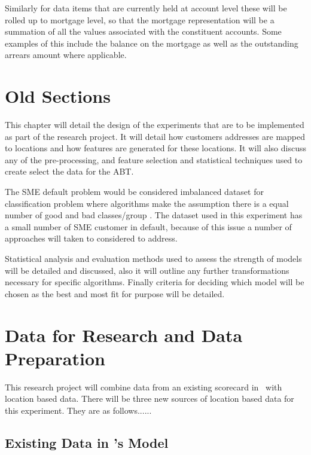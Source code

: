 Similarly for data items that are currently held at account level these will be rolled up to mortgage level, so that the mortgage representation will be a summation of all the values associated with the constituent accounts. Some examples of this include the balance on the mortgage as well as the outstanding arrears amount where applicable.


\section{Old Sections}
This chapter will detail the design of the experiments that are to be implemented as part of the research project. It will detail how customers addresses are mapped to locations and how features are generated for these locations. It will also discuss any of the pre-processing, and feature selection and statistical techniques used to create select the data for the ABT.

The SME default problem would be considered imbalanced dataset for classification problem where algorithms make the assumption there is a equal number of good and bad classes/group \citep{japkowicz_class_2000}. The dataset used in this experiment has a small number of SME customer in default, because of this issue a number of approaches will taken to considered to address.

Statistical analysis and evaluation methods used to assess the strength of models will be detailed and discussed, also it will outline any further transformations necessary for specific algorithms. Finally criteria for deciding which model will be chosen as the best and most fit for purpose will be detailed.

\section{Data for Research and Data Preparation}
This research project will combine data from an existing scorecard in \subjectname\ with location based data. There will be three new sources of location based data for this experiment. They are as follows......

\subsection{Existing Data in \subjectname's Model}

